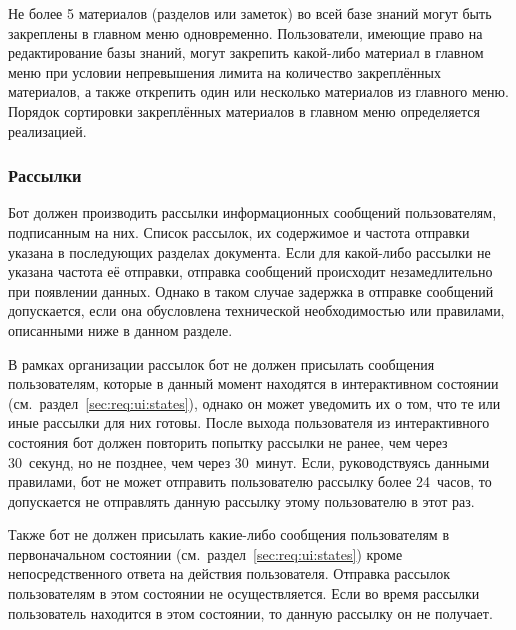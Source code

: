     Не более 5 материалов (разделов или заметок) во всей базе знаний могут быть закреплены в
    главном меню одновременно.  Пользователи, имеющие право на редактирование базы знаний,
    могут закрепить какой-либо материал в главном меню при условии непревышения лимита на
    количество закреплённых материалов, а также открепить один или несколько материалов из
    главного меню. Порядок сортировки закреплённых материалов в главном меню определяется
    реализацией.

\subsubsection{Рассылки}
    \label{sec:req:fn:newsletter}
    Бот должен производить рассылки информационных сообщений
    пользователям, подписанным на них. Список рассылок,
    их содержимое и частота отправки указана в последующих разделах документа.
    Если для какой-либо рассылки не указана частота её отправки, отправка сообщений происходит
    незамедлительно при появлении данных. Однако в таком случае задержка в отправке сообщений допускается,
    если она обусловлена технической необходимостью или правилами, описанными ниже в данном разделе.

    В рамках организации рассылок бот не должен присылать сообщения пользователям,
    которые в данный момент находятся в интерактивном состоянии (см.~раздел~\ref{sec:req:ui:states}),
    однако он может уведомить их о том, что те или иные рассылки для них готовы.
    После выхода пользователя из интерактивного состояния бот должен повторить попытку
    рассылки не ранее, чем через 30~секунд, но не позднее, чем через 30~минут.
    Если, руководствуясь данными правилами, бот не может отправить пользователю рассылку
    более 24~часов, то допускается не отправлять данную рассылку этому пользователю в этот раз.

    Также бот не должен присылать какие-либо сообщения пользователям в первоначальном
    состоянии (см.~раздел~\ref{sec:req:ui:states}) кроме непосредственного ответа на действия
    пользователя. Отправка рассылок пользователям в этом состоянии не осуществляется. Если
    во время рассылки пользователь находится в этом состоянии, то данную рассылку он не получает.

